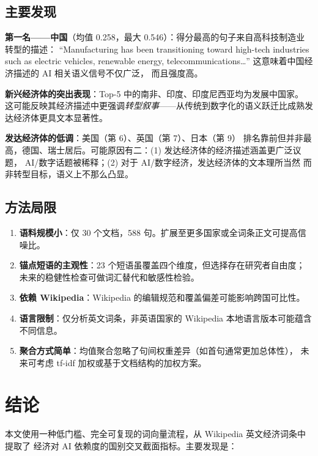 \documentclass[11pt,a4paper]{article}
\begin{document}
\subsection{主要发现}

\textbf{第一名——中国}（均值 0.258，最大 0.546）：得分最高的句子来自高科技制造业转型的描述：
``Manufacturing has been transitioning toward high-tech industries such as electric vehicles,
renewable energy, telecommunications\dots'' 这意味着中国经济描述的 AI 相关语义信号不仅广泛，
而且强度高。

\textbf{新兴经济体的突出表现}：Top-5 中的南非、印度、印度尼西亚均为发展中国家。
这可能反映其经济描述中更强调\emph{转型叙事}——从传统到数字化的语义跃迁比成熟发达经济体更具文本显著性。

\textbf{发达经济体的\guillemotleft 低调\guillemotright}：美国（第 6）、英国（第 7）、日本（第 9）
排名靠前但并非最高，德国、瑞士居后。可能原因有二：(1) 发达经济体的经济描述涵盖更广泛议题，
AI/数字话题被稀释；(2) 对于 AI/数字经济，发达经济体的文本\guillemotleft 理所当然\guillemotright
而非\guillemotleft 转型目标\guillemotright，语义上不那么凸显。

\subsection{方法局限}

\begin{enumerate}[nosep]
    \item \textbf{语料规模小}：仅 30 个文档，588 句。扩展至更多国家或全词条正文可提高信噪比。
    \item \textbf{锚点短语的主观性}：23 个短语虽覆盖四个维度，但选择存在研究者自由度；
    未来的稳健性检查可做词汇替代和敏感性检验。
    \item \textbf{依赖 Wikipedia}：Wikipedia 的编辑规范和覆盖偏差可能影响跨国可比性。
    \item \textbf{语言限制}：仅分析英文词条，非英语国家的 Wikipedia 本地语言版本可能蕴含不同信息。
    \item \textbf{聚合方式简单}：均值聚合忽略了句间权重差异（如首句通常更加总体性），
    未来可考虑 tf-idf 加权或基于文档结构的加权方案。
\end{enumerate}

\section{结论}

本文使用一种低门槛、完全可复现的词向量流程，从 Wikipedia 英文经济词条中提取了
\guillemotleft 经济对 AI 依赖度\guillemotright 的国别交叉截面指标。主要发现是：
\end{document}
